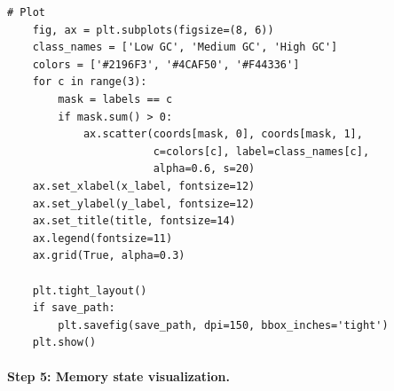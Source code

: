 \begin{lstlisting}[style=dogmapython, caption={Lab 8: PCA and t-SNE visualization of embeddings.}]
    # Plot
    fig, ax = plt.subplots(figsize=(8, 6))
    class_names = ['Low GC', 'Medium GC', 'High GC']
    colors = ['#2196F3', '#4CAF50', '#F44336']
    for c in range(3):
        mask = labels == c
        if mask.sum() > 0:
            ax.scatter(coords[mask, 0], coords[mask, 1],
                       c=colors[c], label=class_names[c],
                       alpha=0.6, s=20)
    ax.set_xlabel(x_label, fontsize=12)
    ax.set_ylabel(y_label, fontsize=12)
    ax.set_title(title, fontsize=14)
    ax.legend(fontsize=11)
    ax.grid(True, alpha=0.3)

    plt.tight_layout()
    if save_path:
        plt.savefig(save_path, dpi=150, bbox_inches='tight')
    plt.show()
\end{lstlisting}

\paragraph{Step 5: Memory state visualization.}

